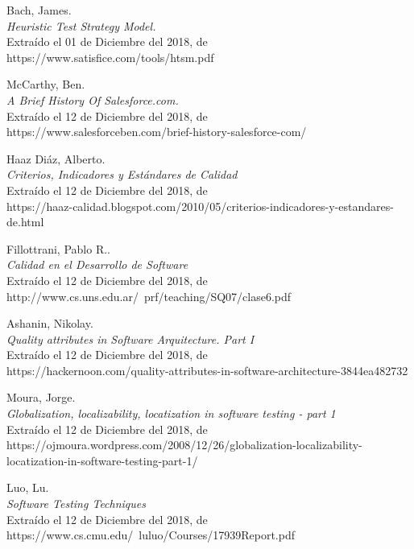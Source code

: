 \begin{thebibliography}{99}

 Bach, James.\\
\emph{Heuristic Test Strategy Model.}\\
Extraído el 01 de Diciembre del 2018, de\\
https://www.satisfice.com/tools/htsm.pdf

 McCarthy, Ben.\\
\emph{A Brief History Of Salesforce.com.}\\
Extraído el 12 de Diciembre del 2018, de\\
https://www.salesforceben.com/brief-history-salesforce-com/

 Haaz Diáz, Alberto.\\
\emph{Criterios, Indicadores y Estándares de Calidad}\\
Extraído el 12 de Diciembre del 2018, de\\
https://haaz-calidad.blogspot.com/2010/05/criterios-indicadores-y-estandares-de.html

 Fillottrani, Pablo R..\\
\emph{Calidad en el Desarrollo de Software}\\
Extraído el 12 de Diciembre del 2018, de\\
http://www.cs.uns.edu.ar/~prf/teaching/SQ07/clase6.pdf

 Ashanin, Nikolay.\\
\emph{Quality attributes in Software Arquitecture. Part I}\\
Extraído el 12 de Diciembre del 2018, de\\
https://hackernoon.com/quality-attributes-in-software-architecture-3844ea482732

 Moura, Jorge.\\
\emph{Globalization, localizability, locatization in software testing - part 1}\\
Extraído el 12 de Diciembre del 2018, de\\
https://ojmoura.wordpress.com/2008/12/26/globalization-localizability-locatization-in-software-testing-part-1/

 Luo, Lu.\\
\emph{Software Testing Techniques}\\
Extraído el 12 de Diciembre del 2018, de\\
https://www.cs.cmu.edu/~luluo/Courses/17939Report.pdf


\end{thebibliography}
